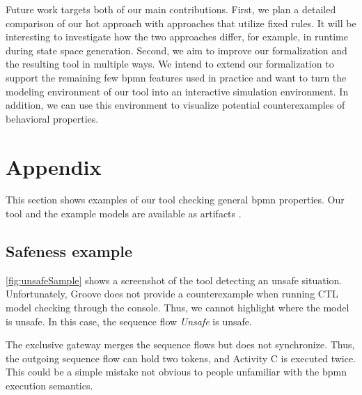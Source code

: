 \documentclass[runningheads]{llncs}
\begin{document}
Future work targets both of our main contributions.
First, we plan a detailed comparison of our \gls*{hot} approach with approaches that utilize fixed rules.
It will be interesting to investigate how the two approaches differ, for example, in runtime during state space generation.
Second, we aim to improve our formalization and the resulting tool in multiple ways.
We intend to extend our formalization to support the remaining few \gls*{bpmn} features used in practice and want to turn the modeling environment of our tool into an interactive simulation environment. %
In addition, we can use this environment to visualize potential counterexamples of behavioral properties.

 


\section{Appendix}


This section shows examples of our tool checking general \gls*{bpmn} properties.
Our tool and the example models are available as artifacts \cite{krauterArtifactsICGT2023}.

\subsection{Safeness example}
\autoref{fig:unsafeSample} shows a screenshot of the tool detecting an unsafe situation.
Unfortunately, Groove does not provide a counterexample when running CTL model checking through the console.
Thus, we cannot highlight where the model is unsafe.
In this case, the sequence flow \textit{Unsafe} is unsafe.

The exclusive gateway merges the sequence flows but does not synchronize.
Thus, the outgoing sequence flow can hold two tokens, and Activity C is executed twice.
This could be a simple mistake not obvious to people unfamiliar with the \gls*{bpmn} execution semantics.
\end{document}
